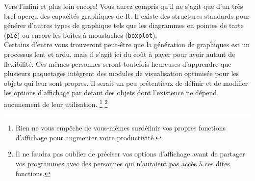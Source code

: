 \begin{moreInfo}{Vers l'infini et plus loin encore!}
	Vous aurez compris qu'il ne s'agit que d'un très bref aperçu des capacités graphiques de R. Il existe des structures standards pour générer d'autres types de graphique tels que les diagrammes en pointes de tarte (\texttt{pie}) ou encore les boîtes à moustaches (\texttt{boxplot}). \\
	Certains d'entre vous trouveront peut-être que la génération de graphiques est un processus lent et ardu, mais il s'agit ici du coût à payer pour avoir autant de flexibilité. Ces mêmes personnes seront toutefois heureuses d'apprendre que plusieurs paquetages intègrent des modules de visualisation optimisée pour les objets qui leur sont propres.  Il serait un peu prétentieux de définir et de modifier les options d’affichage par défaut des objets dont l’existence ne dépend aucunement de leur utilisation. \footnote{Rien ne vous empêche de vous-mêmes surdéfinir vos propres fonctions d'affichage pour augmenter votre productivité.} \footnote{Il ne faudra pas oublier de préciser vos options d'affichage avant de partager vos programmes avec des personnes qui n'auraient pas accès à ces dites fonctions.}
\end{moreInfo}